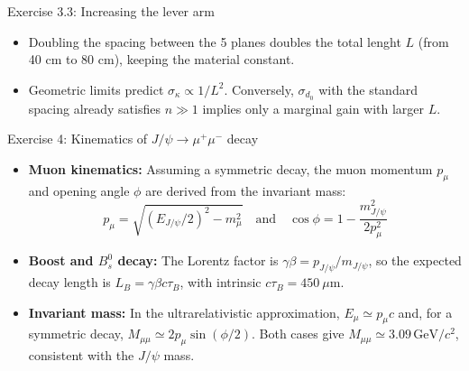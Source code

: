 \begin{frame}{Exercise 3.3: Increasing the lever arm}
    \begin{itemize}
        \item Doubling the spacing between the 5 planes doubles the total lenght $L$ (from 40 cm to 80 cm), keeping the material constant.
        \item Geometric limits predict $\sigma_\kappa \propto 1/L^2$. 
        Conversely, $\sigma_{d_0}$ with the standard spacing already satisfies $n \gg 1$ implies only a marginal gain with larger $L$.
    \end{itemize}
        
    \begin{table}[]
        \centering
        \renewcommand{\arraystretch}{1.3}
    \end{table}
    
\end{frame}


\begin{frame}{Exercise 4: Kinematics of $J/\psi \rightarrow \mu^+\mu^-$ decay}
    \begin{itemize}
        \item \textbf{Muon kinematics:} Assuming a symmetric decay, the muon momentum $p_\mu$ and opening angle $\phi$ are derived from the invariant mass:
        $$ p_\mu = \sqrt{(E_{J/\psi}/2)^2 - m_\mu^2} \quad \text{and} \quad \cos\phi = 1 - \frac{m_{J/\psi}^2}{2p_\mu^2} $$
        \item \textbf{Boost and $B_s^0$ decay:} The Lorentz factor is $\gamma\beta = p_{J/\psi} / m_{J/\psi}$, so the expected decay length is $L_B = \gamma\beta c\tau_B$, with intrinsic $c\tau_B = 450~\mu$m.
        \item \textbf{Invariant mass:} In the ultrarelativistic approximation, $E_\mu \simeq p_\mu c$ and, for a symmetric decay, $M_{\mu\mu} \simeq 2p_\mu\sin(\phi/2)$. Both cases give $M_{\mu\mu} \simeq 3.09\,\mathrm{GeV}/c^2$, consistent with the $J/\psi$ mass.
    \end{itemize}
\end{frame}

